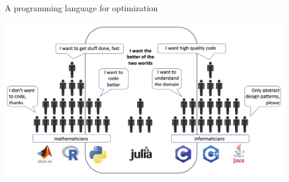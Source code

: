 \documentclass[]{beamer}
\begin{document}
\begin{frame}[fragile]
{ }
   {
  A programming language for optimization
 \hspace{-5mm}\centerline{\includegraphics[width=12.5cm]{posJulia4.png}}
 }

\end{frame}



% 
%
\end{document}
